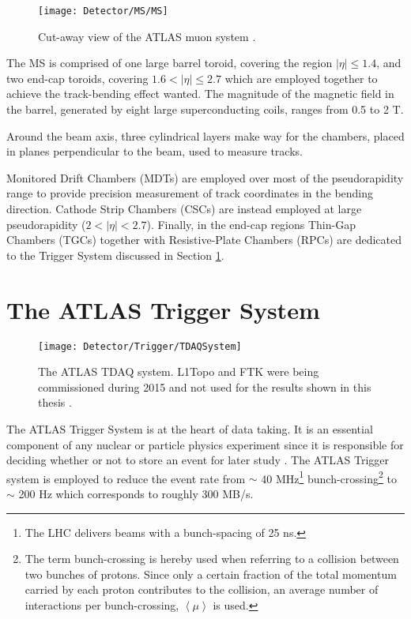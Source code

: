 			\begin{figure}[!htb]
				\centering
				\texttt{[image: Detector/MS/MS]}
				\caption{Cut-away view of the ATLAS muon system \cite{ATLASJINST}.}
				\label{fig:MS}
			\end{figure}

			The MS is comprised of one large barrel toroid, covering the region $\left| \eta \right | \leq 1.4$, and two end-cap toroids, covering $1.6 < \left| \eta \right| \leq 2.7$ which are employed together to achieve the track-bending effect wanted. The magnitude of the magnetic field in the barrel, generated by eight large superconducting coils, ranges from 0.5 to 2 T. 

			Around the beam axis, three cylindrical layers make way for the chambers, placed in planes perpendicular to the beam, used to measure tracks. 

			Monitored Drift Chambers (MDTs) are employed over most of the pseudorapidity range to provide precision measurement of track coordinates in the bending direction. 
			Cathode Strip Chambers (CSCs) are instead employed at large pseudorapidity ($2 < \left | \eta \right | < 2.7$). 
			Finally, in the end-cap regions Thin-Gap Chambers (TGCs) together with Resistive-Plate Chambers (RPCs) are dedicated to the Trigger System discussed in Section \ref{sec:trigSyst}. 


	\section{The ATLAS Trigger System}
	\label{sec:trigSyst}

		\begin{figure}[!htb]
			\centering
			\texttt{[image: Detector/Trigger/TDAQSystem]}
			\caption{The ATLAS TDAQ system. L1Topo and FTK were being commissioned during 2015 and not used for the results shown in this thesis \cite{ATLASTrigger2015}.}
			\label{fig:TDAQSyst}
		\end{figure}

		The ATLAS Trigger System is at the heart of data taking. It is an essential component of any nuclear or particle physics experiment since it is responsible for deciding whether or not to store an event for later study \cite{ATLASTrigger2015}. The ATLAS Trigger system is employed to reduce the event rate from $\sim$ 40 MHz\footnote{The LHC delivers beams with a bunch-spacing of 25 ns.} bunch-crossing\footnote{The term bunch-crossing is hereby used when referring to a collision between two bunches of protons. Since only a certain fraction of the total momentum carried by each proton contributes to the collision, an average number of interactions per bunch-crossing, $\left < \mu \right >$ is used.} to $\sim$ 200 Hz which corresponds to roughly 300 MB/s.

